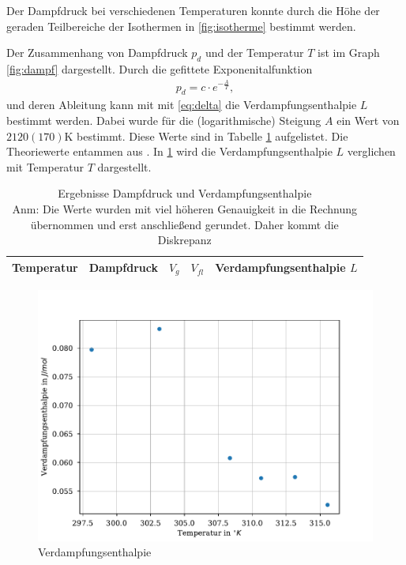 \documentclass[11pt, a4paper]{article}
\begin{document}
    Der Dampfdruck bei verschiedenen Temperaturen konnte durch die Höhe der geraden Teilbereiche
    der Isothermen in \ref{fig:isotherme} bestimmt werden.
    

   Der Zusammenhang von Dampfdruck $p_d$ und der Temperatur $T$ ist im Graph \ref{fig:dampf} dargestellt.
   Durch die gefittete Exponenitalfunktion
    \begin{align}
        p_d = c \cdot e^{-\frac{A}{T}},
    \end{align}
    und deren Ableitung kann mit mit \ref{eq:delta}
    die Verdampfungsenthalpie $L$ bestimmt werden. Dabei wurde für die (logarithmische) Steigung $A$ ein Wert von $2120(170) \si{\kelvin}$ bestimmt. Diese Werte sind in Tabelle \ref{tab:dampfmess}
    aufgelistet. Die Theoriewerte entammen aus \cite{SH6}. In \ref{fig:verd} wird die Verdampfungsenthalpie $L$ verglichen mit Temperatur $T$ dargestellt.
    \begin{table}
        \begin{adjustwidth}{-.5in}{-.5in}
        \centering
        \begin{tabular}{c c c c c}
            Temperatur & Dampfdruck & $V_g$ & $V_{fl}$ & Verdampfungsenthalpie $L$ \\ \hline
            
            
        \end{tabular}
        
        \caption{Ergebnisse Dampfdruck und Verdampfungsenthalpie  \\ Anm: Die Werte wurden mit viel höheren Genauigkeit in die Rechnung übernommen und erst anschließend gerundet. Daher kommt die Diskrepanz} \label{tab:dampfmess}
        \end{adjustwidth}
    \end{table}
    \begin{figure}
        \centering
        \includegraphics[width=\textwidth]{./Plots/verd.pdf}

        \caption{Verdampfungsenthalpie}
        \label{fig:verd}
    \end{figure}
\end{document}
